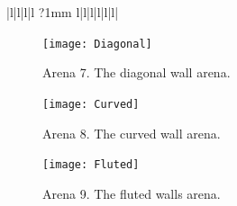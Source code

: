 \documentclass[a4paper,11pt,twoside,openright]{article}
\begin{document}
\begin{center}
\begin{table}
\begin{tabular}{|l|l|l|l ?{1mm} l|l|l|l|l|l|}
   \end{tabular}
   \caption{The results for the behavioural experiments conducted on the optical flow system; for these, arenas were designed to
     elicit a certain behavioural response, however, they mostly failed to do so, highlighting problems with the current implementation
     and methods of experimentation. The ``As expected'' column denotes cases whether the robot performed the expected moves: No means
     not at all, Almost means that movements were initially correct then went wrong, and Yes means complete success.
    }
    \label{tab:ofrestwo}
  \end{table}
\end{center}

\begin{figure}
  \centering
  \texttt{[image: Diagonal]}
  \caption{
    \label{fig:diag} Arena 7. The diagonal wall arena.
  }
\end{figure}

\begin{figure}
  \centering
  \texttt{[image: Curved]}
  \caption{
    \label{fig:curved} Arena 8. The curved wall arena.
  }
\end{figure}

\begin{figure}
  \centering
  \texttt{[image: Fluted]}
  \caption{
    \label{fig:fluted} Arena 9. The fluted walls arena.
  }
\end{figure}
\end{document}
